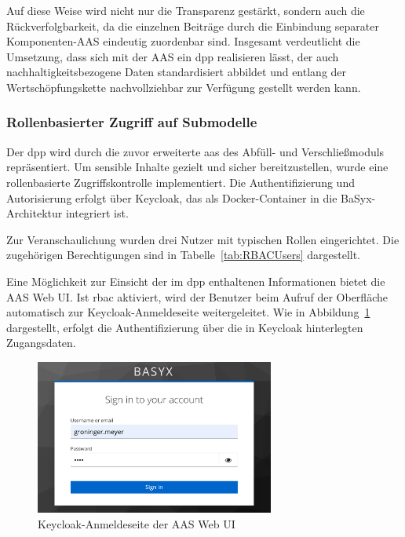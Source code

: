 Auf diese Weise wird nicht nur die Transparenz gestärkt, sondern auch die Rückverfolgbarkeit, da die einzelnen Beiträge durch die Einbindung separater Komponenten-AAS eindeutig zuordenbar sind. 
Insgesamt verdeutlicht die Umsetzung, dass sich mit der AAS ein \acs{dpp} realisieren lässt, der auch nachhaltigkeitsbezogene Daten standardisiert abbildet und entlang der Wertschöpfungskette nachvollziehbar zur Verfügung gestellt werden kann.

\newpage
\subsubsection{Rollenbasierter Zugriff auf Submodelle}
Der \acs{dpp} wird durch die zuvor erweiterte \acs{aas} des Abfüll- und Verschließmoduls repräsentiert. 
Um sensible Inhalte gezielt und sicher bereitzustellen, wurde eine rollenbasierte Zugriffskontrolle implementiert. 
Die Authentifizierung und Autorisierung erfolgt über Keycloak, das als Docker-Container in die BaSyx-Architektur integriert ist.

Zur Veranschaulichung wurden drei Nutzer mit typischen Rollen eingerichtet.
Die zugehörigen Berechtigungen sind in Tabelle~\ref{tab:RBACUsers} dargestellt.


\vspace{-0.25em}   

\vspace{-0.25em}
Eine Möglichkeit zur Einsicht der im \acs{dpp} enthaltenen Informationen bietet die AAS Web UI.
Ist \acs{rbac} aktiviert, wird der Benutzer beim Aufruf der Oberfläche automatisch zur Keycloak-Anmeldeseite weitergeleitet.
Wie in Abbildung~\ref{fig:KeycloakAnmeldeSeite} dargestellt, erfolgt die Authentifizierung über die in Keycloak hinterlegten Zugangsdaten.

\vspace{0.4em}
\begin{figure}[htbp]
    \centering
        \includegraphics[width=0.7\textwidth]{Bilder/KeycloakAnmeldeSeite.png}
    \caption{Keycloak-Anmeldeseite der AAS Web UI}
    \label{fig:KeycloakAnmeldeSeite}
\end{figure}

